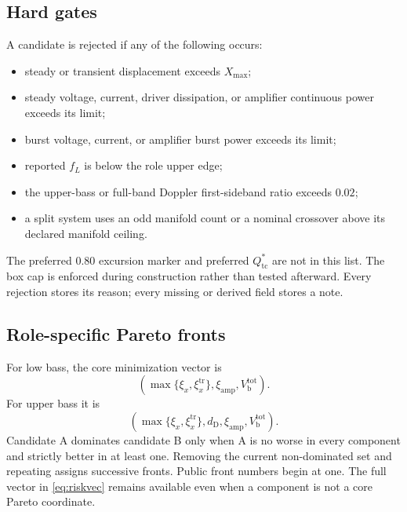 \documentclass[11pt,a4paper]{article}
\numberwithin{equation}{section}
\newcommand{\Xmax}{X_{\mathrm{max}}}
\newcommand{\Qtc}{Q_{\mathrm{tc}}}
\begin{document}
\subsection{Hard gates}
\label{sec:hard-gates}

A candidate is rejected if any of the following occurs:

\begin{itemize}
	\item steady or transient displacement exceeds $\Xmax$;
	\item steady voltage, current, driver dissipation, or amplifier
	continuous power exceeds its limit;
	\item burst voltage, current, or amplifier burst power exceeds its limit;
	\item reported $f_L$ is below the role upper edge;
	\item the upper-bass or full-band Doppler first-sideband ratio exceeds
	$0.02$;
	\item a split system uses an odd manifold count or a nominal crossover
	above its declared manifold ceiling.
\end{itemize}

The preferred $0.80$ excursion marker and preferred $\Qtc^\ast$ are not in
this list.  The box cap is enforced during construction rather than tested
afterward.  Every rejection stores its reason; every missing or derived
field stores a note.

\subsection{Role-specific Pareto fronts}

For low bass, the core minimization vector is
\begin{equation}
	\left(
	\max\{\xi_x,\xi_x^{\mathrm{tr}}\},
	\xi_{\mathrm{amp}},
	V_{\mathrm b}^{\mathrm{tot}}
	\right).
	\label{eq:pareto-sub}
\end{equation}
For upper bass it is
\begin{equation}
	\left(
	\max\{\xi_x,\xi_x^{\mathrm{tr}}\},
	d_{\mathrm D},
	\xi_{\mathrm{amp}},
	V_{\mathrm b}^{\mathrm{tot}}
	\right).
	\label{eq:pareto-upper}
\end{equation}
Candidate A dominates candidate B only when A is no worse in every component
and strictly better in at least one.  Removing the current non-dominated set
and repeating assigns successive fronts.  Public front numbers begin at one.
The full vector in \cref{eq:riskvec} remains available even when a component
is not a core Pareto coordinate.
\end{document}
